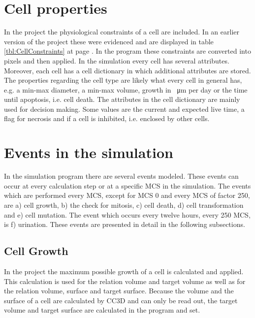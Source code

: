\section{Cell properties}
In the project the physiological constraints of a cell are included. In an earlier version of the project these were evidenced \cite{Torelli2017} and are displayed in table \ref{tbl:CellConstraints} at page \pageref{tbl:CellConstraints}. In the program these constraints are converted into pixels and then applied. \newline
In the simulation every cell has several attributes. Moreover, each cell has a cell dictionary in which additional attributes are stored. The properties regarding the cell type are likely what every cell in general has, e.g. a min-max diameter, a min-max volume, growth in \SI{}{\micro\metre} per day or the time until apoptosis, i.e. cell death. \newline
The attributes in the cell dictionary are mainly used for decision making. Some values are the current and expected live time, a flag for necrosis and if a cell is inhibited, i.e. enclosed by other cells. \newline


\section{Events in the simulation}
In the simulation program there are several events modeled. These events can occur at every calculation step or at a specific \ac{MCS} in the simulation. \newline
The events which are performed every \ac{MCS}, except for \ac{MCS} 0 and every \ac{MCS} of factor 250, are a) cell growth, b) the check for mitosis, c) cell death, d) cell transformation and e) cell mutation. The event which occurs every twelve hours, every 250 \ac{MCS}, is f) urination. These events are presented in detail in the following subsections.

\subsection{Cell Growth}
In the project the maximum possible growth of a cell is calculated and applied. This calculation is used for the relation volume and target volume as well as for the relation volume, surface and target surface. Because the volume and the surface of a cell are calculated by \ac{CC3D} and can only be read out, the target volume and target surface are calculated in the program and set.

